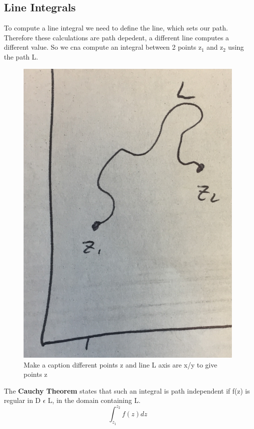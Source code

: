 \documentclass{article}
\newcommand{\be}{\begin{equation}}
\newcommand{\ee}{\end{equation}}
\begin{document}
\subsection*{Line Integrals}
To compute a line integral we need to define the line, which sets our path. 
Therefore these calculations are path depedent, a different line computes a different value. 
So we cna compute an integral between 2 points z$_1$ and z$_2$ using the path L.
\begin{figure}[H]
  \centering
  \includegraphics[scale=0.2]{Figures/line.png}
    \caption{Make a caption different points z and line L axis are x/y to give points z}
\end{figure}

The \textbf{Cauchy Theorem} states that such an integral is path independent if f(z) is regular in D $\epsilon$ L, in the domain containing L.  
\be
\int_{z_1}^{z_2} f(z) dz
\ee
\end{document}
